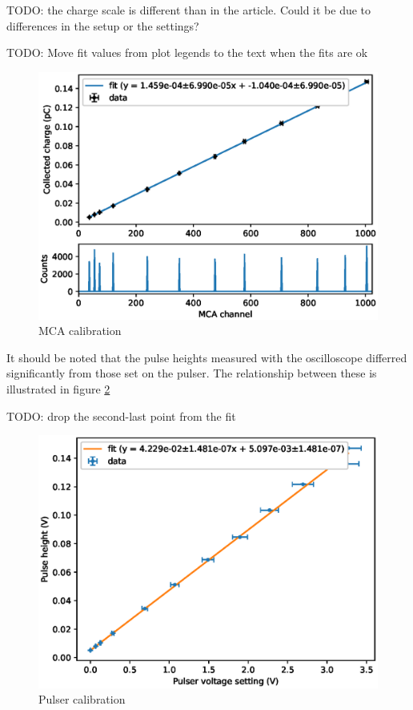 \documentclass[a4paper]{article}
\begin{document}
TODO: the charge scale is different than in the article.
Could it be due to differences in the setup or the settings?

TODO: Move fit values from plot legends to the text when the fits are ok

\begin{figure}[ht!]
\centering
\includegraphics[width=\textwidth]{fig/python/mca_calibration.eps}
\caption{MCA calibration}
\label{fig:mca_calibration}
\end{figure}

It should be noted that the pulse heights measured with the oscilloscope differred significantly from those set on the pulser.
The relationship between these is illustrated in figure \ref{fig:pulser_calibration}

TODO: drop the second-last point from the fit

\begin{figure}[ht!]
\centering
\includegraphics[width=\textwidth]{fig/python/pulser_calibration.eps}
\caption{Pulser calibration}
\label{fig:pulser_calibration}
\end{figure}
\end{document}

